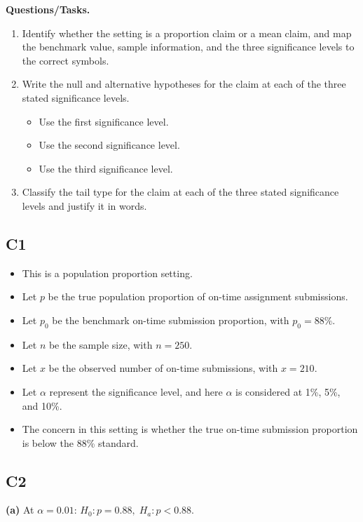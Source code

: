 \begin{ExamProblems}
		\textbf{Questions/Tasks.}
		\begin{enumerate}
			\item[(C1)] Identify whether the setting is a proportion claim or a mean claim, and map the benchmark value, sample information, and the three significance levels to the correct symbols.
			\item[(C2)] Write the null and alternative hypotheses for the claim at each of the three stated significance levels.
			\begin{itemize}
				\item[(a)] Use the first significance level.
				\item[(b)] Use the second significance level.
				\item[(c)] Use the third significance level.
			\end{itemize}
			\item[(C3)] Classify the tail type for the claim at each of the three stated significance levels and justify it in words.
		\end{enumerate}
		
		\subsection*{C1}
		\begin{itemize}
			\item This is a population proportion setting.
			\item Let \(p\) be the true population proportion of on-time assignment submissions.
			\item Let \(p_0\) be the benchmark on-time submission proportion, with \(p_0=88\%\).
			\item Let \(n\) be the sample size, with \(n=250\).
			\item Let \(x\) be the observed number of on-time submissions, with \(x=210\).
			\item Let \(\alpha\) represent the significance level, and here \(\alpha\) is considered at 1\%, 5\%, and 10\%.
			\item The concern in this setting is whether the true on-time submission proportion is below the 88\% standard.
		\end{itemize}
		
		\subsection*{C2}
		\textbf{(a)} At \(\alpha=0.01\): \(H_0\colon p=0.88,\; H_a\colon p<0.88\).
		

\end{ExamProblems}
